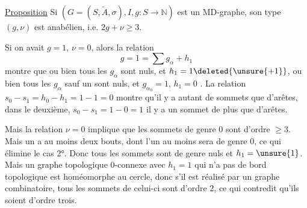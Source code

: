 \uline{Proposition} Si $(G=(S,\widetilde A,\sigma),I,g:S\to\mathbb N)$ est un MD-graphe, son type $(g,\nu)$ est anabélien, i.e. $2g+\nu\geq3$.

Si on avait $g=1$, $\nu=0$, alors la relation
\[
g=1=\sum g_\alpha+h_1
\]
montre que ou bien tous les $g_\alpha$ sont nuls, et $h_1=1\deleted{\unsure{+1}}$, ou bien tous les $g_\alpha$ sauf un  sont nuls, et $g_{\alpha_0}=1$, $h_1=0$ .  La relation $s_0-s_1=h_0-h_1=1-1=0$ montre qu'il y a autant de sommets que d'arêtes, dans le deuxième, $s_0-s_1=1-0=1$ il y a un sommet de plus que d'arêtes.

Mais la relation $\nu=0$ implique que les sommets de genre $0$ sont d'ordre $\geq3$.  Mais un   a au moins deux bouts, dont l'un au moins sera de genre $0$, ce qui élimine le cas 2°. Donc tous les sommets sont de genre nuls  et $h_1=\unsure{1}$. Mais  un graphe topologique $0$-connexe avec $h_1=1$ qui n'a pas de  bord topologique est homéomorphe au cercle, donc s'il est réalisé par un graphe combinatoire, tous les sommets de celui-ci sont d'ordre $2$, ce qui contredit qu'ils soient d'ordre trois.
